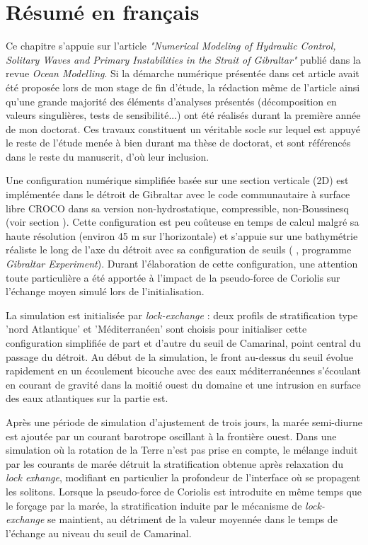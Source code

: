 \section{Résumé en français}

Ce chapitre s'appuie sur l'article \textit{"Numerical Modeling of Hydraulic Control, Solitary Waves and Primary Instabilities in the Strait of Gibraltar"} \citep{hilt_2020} publié dans la revue \textit{Ocean Modelling}. Si la démarche numérique présentée dans cet article avait été proposée lors de mon stage de fin d'étude, la rédaction même de l'article ainsi qu'une grande majorité des éléments d'analyses présentés (décomposition en valeurs singulières, tests de sensibilité...) ont été réalisés durant la première année de mon doctorat. Ces travaux constituent un véritable socle sur lequel est appuyé le reste de l'étude menée à bien durant ma thèse de doctorat, et sont référencés dans le reste du manuscrit, d'où leur inclusion.

Une configuration numérique simplifiée basée sur une section verticale (2D) est implémentée dans le détroit de Gibraltar avec le code communautaire à surface libre CROCO dans sa version non-hydrostatique, compressible, non-Boussinesq (voir section ). Cette configuration est peu coûteuse en temps de calcul malgré sa haute résolution (environ 45 m sur l'horizontale) et s'appuie sur une bathymétrie réaliste le long de l'axe du détroit avec sa configuration de seuils ( \citet{FA1988}, programme \textit{Gibraltar Experiment}). Durant l'élaboration de cette configuration, une attention toute particulière a été apportée à l'impact de la pseudo-force de Coriolis sur l'échange moyen simulé lors de l'initialisation.

La simulation est initialisée par \textit{lock-exchange} : deux profils de stratification type 'nord Atlantique' et 'Méditerranéen' sont choisis pour initialiser cette configuration simplifiée de part et d'autre du seuil de Camarinal, point central du passage du détroit. Au début de la simulation, le front au-dessus du seuil évolue rapidement en un écoulement bicouche avec des eaux méditerranéennes s'écoulant en courant de gravité dans la moitié ouest du domaine et une intrusion en surface des eaux atlantiques sur la partie est. 

Après une période de simulation d'ajustement de trois jours, la marée semi-diurne est ajoutée par un courant barotrope oscillant à la frontière ouest. Dans une simulation où la rotation de la Terre n'est pas prise en compte, le mélange induit par les courants de marée détruit la stratification obtenue après relaxation du \textit{lock exhange}, modifiant en particulier la profondeur de l'interface où se propagent les solitons. Lorsque la pseudo-force de Coriolis est introduite en même temps que le forçage par la marée, la stratification induite par le mécanisme de \textit{lock-exchange} se maintient, au détriment de la valeur moyennée dans le temps de l'échange au niveau du seuil de Camarinal.

